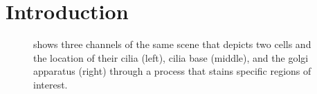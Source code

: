 \documentclass[sigconf]{acmart}
\begin{document}


\maketitle

\section{Introduction}
\label{sec:intro}


\begin{figure}
	\centering
	 \hfill
	 \hfill
	\caption{shows three channels of the same scene that depicts two cells and the location of their cilia (left), cilia base (middle), and the golgi apparatus (right) through a process that stains specific regions of interest.}
\end{figure}
\end{document}
